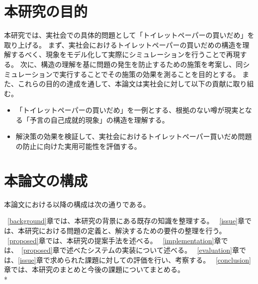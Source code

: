 \section{本研究の目的}

本研究では、実社会での具体的問題として「トイレットペーパーの買いだめ」を取り上げる。
まず、実社会におけるトイレットペーパーの買いだめの構造を理解するべく、現象をモデル化して実際にシミュレーションを行うことで再現する。
次に、構造の理解を基に問題の発生を防止するための施策を考案し、同シミュレーションで実行することでその施策の効果を測ることを目的とする。
また、これらの目的の達成を通して、本論文は実社会に対して以下の貢献に取り組む。

\begin{itemize}
  \item 「トイレットペーパーの買いだめ」を一例とする、根拠のない噂が現実となる「予言の自己成就的現象」の構造を理解する。
  \item 解決策の効果を検証して、実社会におけるトイレットペーパー買いだめ問題の防止に向けた実用可能性を評価する。
\end{itemize}

\section{本論文の構成}

本論文における以降の構成は次の通りである。

~\ref{background}章では、本研究の背景にある既存の知識を整理する。
~\ref{issue}章では、本研究における問題の定義と、解決するための要件の整理を行う。
~\ref{proposed}章では、本研究の提案手法を述べる。
~\ref{implementation}章では、~\ref{proposed}章で述べたシステムの実装について述べる。
~\ref{evaluation}章では、\ref{issue}章で求められた課題に対しての評価を行い、考察する。
~\ref{conclusion}章では、本研究のまとめと今後の課題についてまとめる。\\*



